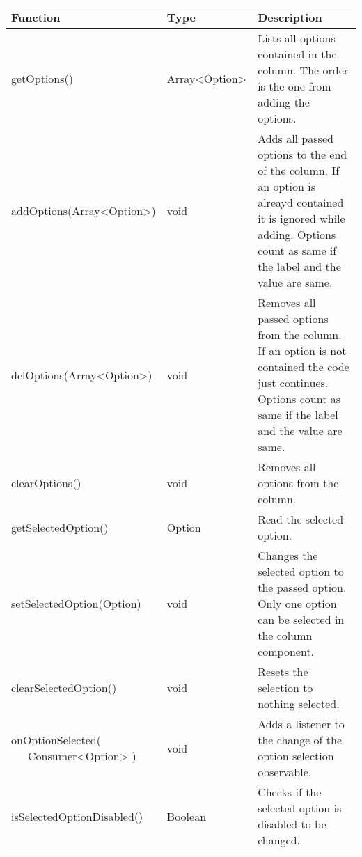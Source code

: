 \begin{table}[!htb] 
    \label{api:columnOptionsComponentReturn}
    \footnotesize
    \setlength\extrarowheight{4pt}
    \begin{tabular}{ p{5cm} p{3cm} p{4.5cm} }
        \toprule[1.2pt]
        \textbf{Function}                   & \textbf{Type}  & \textbf{Description} \\
        \midrule
        getOptions()                        & Array<Option>  & Lists all options contained in the column. 
                                                               The order is the one from adding the options. \\
        addOptions(Array<Option>)           & void           & Adds all passed options to the end of the column. 
                                                               If an option is alreayd contained it is ignored while adding. 
                                                               Options count as same if the label and the value are same. \\
        delOptions(Array<Option>)           & void           & Removes all passed options from the column. 
                                                               If an option is not contained the code just continues. 
                                                               Options count as same if the label and the value are same. \\
        clearOptions()                      & void           & Removes all options from the column. \\
        getSelectedOption()                 & Option         & Read the selected option. \\
        setSelectedOption(Option)           & void           & Changes the selected option to the passed option. 
                                                               Only one option can be selected in the column component. \\
        clearSelectedOption()               & void           & Resets the selection to nothing selected. \\
        \tbbr{
            onOptionSelected( \\
                \ \ \ Consumer<Option>
            )}                              & void           & Adds a listener to the change of the option selection observable. \\
        isSelectedOptionDisabled()          & Boolean        & Checks if the selected option is disabled to be changed. \\

\end{tabular}
\end{table}
